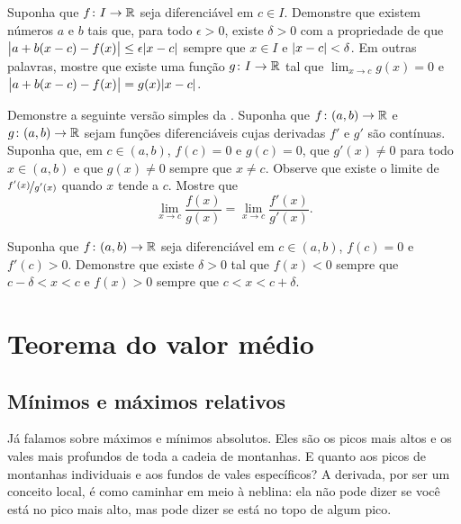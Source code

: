 \begin{exercise}
Suponha que $f \colon I \to {\mathbb{R}}$ seja diferenciável em $c \in I$.
Demonstre que existem números $a$ e $b$ tais que, para todo $\epsilon > 0$,
existe $\delta > 0$ com a propriedade de que
$\bigl\lvert {a+b(x-c) - f(x)} \bigr\rvert \leq \epsilon \lvert {x-c} \rvert$ sempre que $x \in I$ e
$\lvert {x-c} \rvert < \delta$.
Em outras palavras, mostre que existe uma função $g \colon I \to {\mathbb{R}}$
tal que $\lim_{x\to c} g(x) = 0$ e
$\bigl\lvert {a+b(x-c) - f(x)} \bigr\rvert = g(x) \lvert {x-c} \rvert$.
\end{exercise}

\begin{exercise} \label{exercise:simpleLHopital}
Demonstre a seguinte versão simples da .
Suponha que
$f \colon (a,b) \to {\mathbb{R}}$ e $g \colon (a,b) \to {\mathbb{R}}$ sejam funções diferenciáveis
cujas derivadas $f'$ e $g'$ são contínuas.
Suponha que, em $c \in (a,b)$, $f(c) = 0$ e $g(c)=0$,
que $g'(x) \neq 0$ para todo $x \in (a,b)$ e que
$g(x) \neq 0$ sempre que $x \neq c$. Observe
que existe o limite de $\nicefrac{f'(x)}{g'(x)}$ quando $x$ tende a $c$. Mostre que
\begin{equation*}
\lim_{x \to c} \frac{f(x)}{g(x)} = 
\lim_{x \to c} \frac{f'(x)}{g'(x)} .
\end{equation*}
\end{exercise}

\begin{exercise}
Suponha que $f \colon (a,b) \to {\mathbb{R}}$ seja diferenciável em $c \in (a,b)$,
$f(c)=0$ e $f'(c) > 0$.
Demonstre que existe $\delta > 0$ tal que $f(x) < 0$
sempre que $c-\delta < x < c$ e
$f(x) > 0$
sempre que $c < x < c+\delta$.
\end{exercise}


\sectionnewpage
\section{Teorema do valor médio}
\label{sec:mvt}



\subsection{Mínimos e máximos relativos}

Já falamos sobre máximos e mínimos absolutos. Eles são os picos mais altos
e os vales mais profundos de toda a cadeia de montanhas. E quanto aos picos
de montanhas individuais e aos fundos de vales específicos?
A derivada, por ser um conceito local, é como caminhar em meio à neblina:
ela não pode dizer se você está no pico mais alto, mas pode dizer se está
no topo de algum pico.

